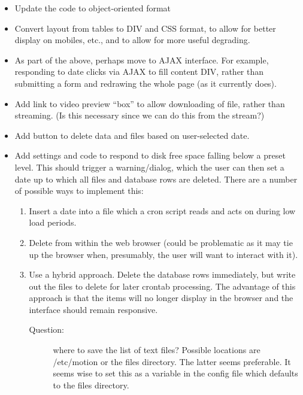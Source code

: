 \documentclass[12pt]{scrartcl} %
\begin{document}
	\begin{itemize}
		\item Update the code to object-oriented format
		
		\item Convert layout from tables to DIV and CSS format, to allow for better display on mobiles, etc., and to allow for more useful degrading.
		
		\item As part of the above, perhaps move to AJAX interface. For example, responding to date clicks via AJAX to fill content DIV, rather than submitting a form and redrawing the whole page (as it currently does).

		\item Add link to video preview \enquote{box} to allow downloading of file, rather
		than streaming. (Is this necessary since we can do this from the stream?)

		\item Add button to delete data and files based on user-selected date.

		\item Add settings and code to respond to disk free space falling below a preset level.
		This should trigger a warning/dialog, which the user can then set a date up to which
		all files and database rows are deleted. There are a number of possible ways to implement this:
		\begin{enumerate}
			\item Insert a date into a file which a cron script reads
			and acts on during low load periods.
			\item Delete from within the web browser
			(could be problematic as it may tie up the browser when, presumably,
			the user will want to interact with it).
			\item Use a hybrid approach. Delete the database rows immediately, but write out the files to delete for later crontab processing. The advantage of this approach is that the items will no longer display in the browser and the interface should remain responsive.
			\begin{description}
				\item [Question:] where to save the list of text files? Possible locations are /etc/motion or the files directory. The latter seems preferable. It seems wise to set this as a variable in the config file which defaults to the files directory.
			\end{description}
		\end{enumerate}


\end{itemize}
\end{document}
